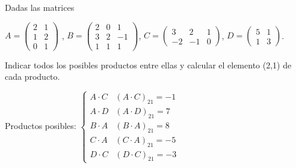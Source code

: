 \begin{ejer}
 Dadas  las matrices

$A=\begin{pmatrix}
 2 & 1 \\
 1 &  2 \\
 0 & 1
\end{pmatrix} $
, 
$B=\begin{pmatrix}
 2 & 0 & 1 \\
 3 & 2 & -1 \\
 1 & 1 & 1
\end{pmatrix} $,
 $C=\begin{pmatrix}
 3 & 2 & 1 \\
 -2 & -1 & 0
\end{pmatrix} $, 
$D=\begin{pmatrix}
 5 & 1 \\
 1 & 3
\end{pmatrix} $.

Indicar todos los posibles productos entre ellas y calcular el elemento (2,1) de cada producto.

\begin{solu}

Productos posibles:
$\begin{cases} 
A \cdot C & (A \cdot C)_{21}=-1 \\ 
A \cdot D & (A \cdot D)_{21}=7 \\ 
B \cdot A & (B \cdot A)_{21}=8 \\
C \cdot A & (C \cdot A)_{21}=-5 \\
D \cdot C & (D \cdot C)_{21}=-3 
\end{cases} $

\end{solu}
\end{ejer}

